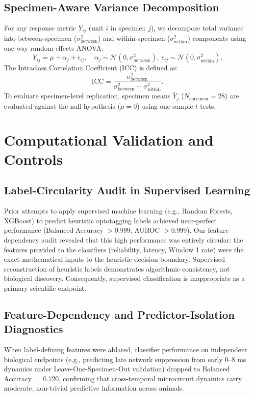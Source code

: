 \documentclass[10pt,journal,compsoc]{IEEEtran}
\begin{document}
\subsection{Specimen-Aware Variance Decomposition}
For any response metric $Y_{ij}$ (unit $i$ in specimen $j$), we decompose total variance into between-specimen ($\sigma_{\text{between}}^2$) and within-specimen ($\sigma_{\text{within}}^2$) components using one-way random-effects ANOVA:
\begin{equation}
    Y_{ij} = \mu + \alpha_j + \epsilon_{ij}, \quad \alpha_j \sim \mathcal{N}(0, \sigma_{\text{between}}^2), \ \epsilon_{ij} \sim \mathcal{N}(0, \sigma_{\text{within}}^2).
\end{equation}
The Intraclass Correlation Coefficient (ICC) is defined as:
\begin{equation}
    \text{ICC} = \frac{\sigma_{\text{between}}^2}{\sigma_{\text{between}}^2 + \sigma_{\text{within}}^2}.
\end{equation}
To evaluate specimen-level replication, specimen means $\bar{Y}_j$ ($N_{\text{specimen}}=28$) are evaluated against the null hypothesis ($\mu = 0$) using one-sample $t$-tests.

\section{Computational Validation and Controls}

\subsection{Label-Circularity Audit in Supervised Learning}
Prior attempts to apply supervised machine learning (e.g., Random Forests, XGBoost) to predict heuristic optotagging labels achieved near-perfect performance (Balanced Accuracy $>0.999$, AUROC $>0.999$). Our feature dependency audit revealed that this high performance was entirely circular: the features provided to the classifiers (reliability, latency, Window 1 rate) were the exact mathematical inputs to the heuristic decision boundary. Supervised reconstruction of heuristic labels demonstrates algorithmic consistency, not biological discovery. Consequently, supervised classification is inappropriate as a primary scientific endpoint.

\subsection{Feature-Dependency and Predictor-Isolation Diagnostics}
When label-defining features were ablated, classifier performance on independent biological endpoints (e.g., predicting late network suppression from early $0–8\text{ ms}$ dynamics under Leave-One-Specimen-Out validation) dropped to Balanced Accuracy $= 0.720$, confirming that cross-temporal microcircuit dynamics carry moderate, non-trivial predictive information across animals.
\end{document}

